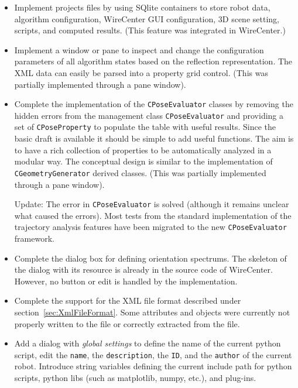 \documentclass[11pt,a4paper,onepage,openany]{book}
\begin{document}
\begin{itemize}
\item Implement projects files by using SQlite containers to store robot
    data, algorithm configuration, WireCenter GUI configuration, 3D scene
    setting, scripts, and computed results. (This feature was integrated in
    WireCenter.)

\item Implement a window or pane to inspect and change the configuration
    parameters of all algorithm states based on the reflection
    representation. The XML data can easily be parsed into a property grid
    control. (This was partially implemented through a pane window).

\item Complete the implementation of the \texttt{CPoseEvaluator} classes by
    removing the hidden errors from the management class
    \texttt{CPoseEvaluator} and providing a set of \texttt{CPoseProperty} to
    populate the table with useful results. Since the basic draft is
    available it should be simple to add useful functions. The aim is to have
    a rich collection of properties to be automatically analyzed in a modular
    way. The conceptual design is similar to the implementation of
    \texttt{CGeometryGenerator} derived classes. (This was partially implemented
    through a pane window).

    Update: The error in \texttt{CPoseEvaluator} is solved (although
    it remains unclear what caused the errors). Most tests from the standard
    implementation of the trajectory analysis features have been migrated to
    the new \texttt{CPoseEvaluator} framework.

\item Complete the dialog box for defining orientation spectrums. The
    skeleton of the dialog with its resource is already in the source code of
    WireCenter. However, no button or edit is handled by the implementation.

\item Complete the support for the XML file format described under
    section~\ref{sec:XmlFileFormat}. Some attributes and objects were
    currently not properly written to the file or correctly extracted from
    the file.

\item Add a dialog with \emph{global settings} to define the name of the
    current python script, edit the \texttt{name}, the \texttt{description},
    the \texttt{ID}, and the \texttt{author} of the current robot. Introduce
    string variables defining the current include path for python scripts,
    python libs (such as matplotlib, numpy, etc.), and plug-ins.


\end{itemize}
\end{document}
